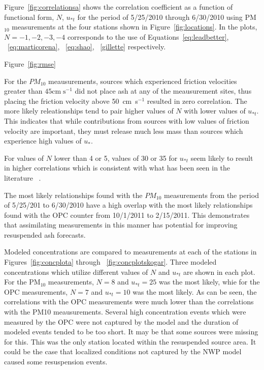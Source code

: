 \documentclass[draft]{agujournal2018}
\begin{document}
Figure~\ref{fig:correlationsa} shows the correlation coefficient as a function of functional form, $N$, $u_{*t}$ for the period
of 5/25/2010 through 6/30/2010 using PM$_{10}$ measurements at the four stations shown in Figure~\ref{fig:locations}.
In the plots, $N=-1, -2, -3, -4$ corresponds to the use of Equations~\ref{eq:leadbetter}, ~\ref{eq:marticorena}, ~\ref{eq:shao}, ~\ref{gillette} respectively.

Figure~\ref{fig:rmse}


For the $PM_{10}$ meausurements, sources which experienced friction velocities greater than $45 \mathrm{cm} \; \mathrm{s}^{-1}$
did not place ash at any of the meausurement sites, thus placing the friction velocity above 50~cm~s$^{-1}$ resulted in zero
correlation.  
The more likely releationships tend to  pair higher values of $N$ with lower values of $u_{*t}$. This indicates that while
contributions from sources with low values of friction velocity are important, they must release much less mass than sources
which experience high values of $u_{*}$.

For values of $N$ lower than 4 or 5, values of 30 or 35 for $u_{*t}$ seem likely to result in higher correlations 
 which is consistent with what
has been seen in the literature ~\citep{Leadbetter12, Folch14}.

The most likely relationships found with the $PM_{10}$ measurements from the period of 5/25/201 to 6/30/2010 have
a high overlap with the most likely relationships found with the OPC counter from 10/1/2011 to 2/15/2011.
This demonstrates that assimilating measurements in this manner has potential for improving resuspended ash forecasts.

Modeled concentrations are compared to measurements at each of the stations in Figures~\ref{fig:concplota} through ~\ref{fig:concplotskogar}.
Three modeled concentrations which utilize different values of $N$ and $u_{*t}$ are shown in each plot.
For the PM$_{10}$ measurements, $N=8$ and $u_{*t}=25$ was the most likely, whie for the OPC measurements, $N=7$ and $u_{*t}=10$
was the most likely.  As can be seen, the correlations with the OPC measurements were much lower than the correlations with the PM10 meausurements.
Several high concentration events which were measured by the OPC were not captured by the model and the duration of modeled events tended to be
too short. It may be that some sources were missing for this. This was the only station located within the resuspended source area. It could
be the case that localized conditions not captured by the NWP model caused some resuspension events.
\end{document}
